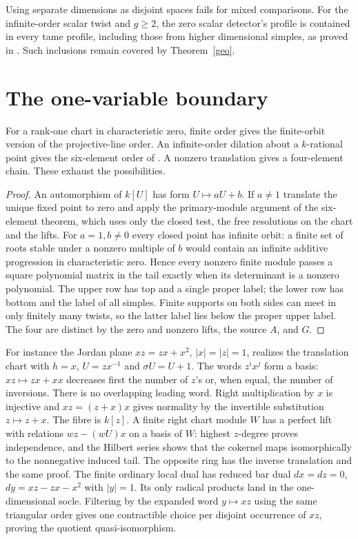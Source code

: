 \documentclass[11pt]{article}
\begin{document}
Using separate dimensions as disjoint spaces fails for mixed comparisons.
For the infinite-order scalar twist and $g\ge2$, the zero scalar detector's
profile is contained in every tame profile, including those from higher
dimensional simples, as proved in . Such inclusions remain covered by Theorem~\ref{geo}.

\section{The one-variable boundary}
\begin{cor}
For a rank-one chart in characteristic zero, finite order gives the
finite-orbit version of the projective-line order. An infinite-order
dilation about a $k$-rational point gives the six-element order of
. A nonzero
translation gives a four-element chain. These exhaust the possibilities.
\end{cor}
\begin{proof}
An automorphism of $k[U]$ has form $U\mapsto aU+b$. If $a\ne1$
translate the unique fixed point to zero and apply the primary-module
argument of the six-element theorem, which uses only the closed test,
the free resolutions on the chart and the lifts. For $a=1,b\ne0$
every closed point has infinite orbit: a finite set of roots stable
under a nonzero multiple of $b$ would contain an infinite additive
progression in characteristic zero. Hence every nonzero finite module
passes a square polynomial matrix in the tail exactly when its
determinant is a nonzero polynomial. The upper row has top and a single
proper label; the lower row has bottom and the label of all simples.
Finite supports on both sides can meet in only finitely many twists,
so the latter label lies below the proper upper label. The four are
distinct by the zero and nonzero lifts, the source $A$, and $G$.
\end{proof}

For instance the Jordan plane $xz=zx+x^2$, $|x|=|z|=1$, realizes the
translation chart with $h=x$, $U=zx^{-1}$ and $\sigma U=U+1$.
The words $z^i x^j$ form a basis: $xz\mapsto zx+xx$ decreases first
the number of $z$'s or, when equal, the number of inversions. There
is no overlapping leading word. Right multiplication by $x$ is
injective and $xz=(z+x)x$ gives normality by the invertible substitution
$z\mapsto z+x$. The fibre is $k[z]$. A finite right chart module $W$
has a perfect lift with relations $wz-(wU)x$ on a basis of $W$:
highest $z$-degree proves independence, and the Hilbert series shows
that the cokernel maps isomorphically to the nonnegative induced tail.
The opposite ring has the inverse translation and the same proof.
The finite ordinary local dual has reduced bar dual $dx=dz=0$,
$dy=xz-zx-x^2$ with $|y|=1$. Its only radical products land in the
one-dimensional socle. Filtering by the expanded word $y\mapsto xz$
using the same triangular order gives one contractible choice per
disjoint occurrence of $xz$, proving the quotient quasi-isomorphism.
\end{document}
